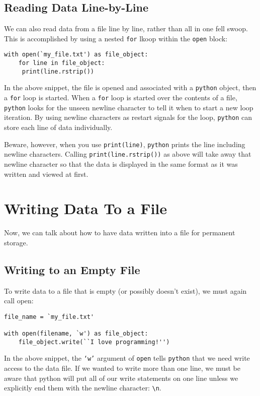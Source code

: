 \documentclass[11pt]{article}
\begin{document}
\subsection{Reading Data Line-by-Line}
\label{sec:org819d477}
We can also read data from a file line by line, rather than all in one fell swoop. This is
accomplished by using a nested \texttt{for} lkoop within the \texttt{open} block:

\begin{verbatim}
with open(`my_file.txt') as file_object:
    for line in file_object:
	 print(line.rstrip())
\end{verbatim}

In the above snippet, the file is opened and associated with a \texttt{python} object, then a
\texttt{for} loop is started. When a \texttt{for} loop is started over the contents of a file, \texttt{python}
looks for the unseen newline character to tell it when to start a new loop iteration. By
using newline characters as restart signals for the loop, \texttt{python} can store each line of
data individually.

Beware, however, when you use \texttt{print(line)}, \texttt{python} prints the line including newline
characters. Calling \texttt{print(line.rstrip())} as above will take away that newline character
so that the data is displayed in the same format as it was written and viewed at first.

\section{Writing Data To a File}
\label{sec:orgada096c}
Now, we can talk about how to have data written into a file for permanent storage.

\subsection{Writing to an Empty File}
\label{sec:org59720b5}
To write data to a file that is empty (or possibly doesn't exist), we must again call open:

\begin{verbatim}
file_name = `my_file.txt'

with open(filename, `w') as file_object:
    file_object.write(``I love programming!'')
\end{verbatim}

In the above snippet, the \texttt{`w'} argument of \texttt{open} tells \texttt{python} that we need write access to
the data file. If we wanted to write more than one line, we must be aware that python will put all
of our write statements on one line unless we explicitly end them with the newline character: \texttt{\textbackslash{}n}.
\end{document}
